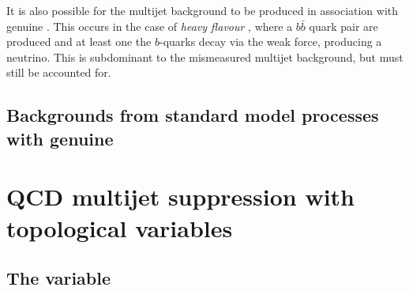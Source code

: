 It is also possible for the \QCD multijet background to be produced in
association with genuine \MET. This occurs in the case of \emph{heavy
flavour} \QCD, where a $b\bar{b}$ quark pair are produced and at least
one the $b$-quarks decay via the weak force, producing a neutrino.
This is subdominant to the mismeasured multijet background, but must
still be accounted for. 


\subsection{Backgrounds from standard model processes with genuine
\MET}




\section{QCD multijet suppression with topological variables} %
\label{sec:challenge}


\subsection{The \alphat variable}

